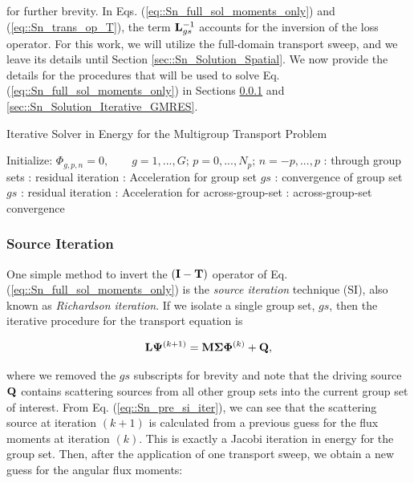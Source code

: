\noindent for further brevity. In Eqs. (\ref{eq::Sn_full_sol_moments_only}) and (\ref{eq::Sn_trans_op_T}), the term ${\bf L}_{gs}^{-1}$ accounts for the inversion of the loss operator. For this work, we will utilize the full-domain transport sweep, and we leave its details until Section \ref{sec::Sn_Solution_Spatial}. We now provide the details for the procedures that will be used to solve Eq. (\ref{eq::Sn_full_sol_moments_only}) in Sections \ref{sec::Sn_Solution_Iterative_SI} and \ref{sec::Sn_Solution_Iterative_GMRES}.

\begin{algorithm}
\caption{Iterative Solver in Energy for the Multigroup Transport Problem}
\label{alg::Sn_Linear_Transport_Solve}
\begin{algorithmic}[1]
\State Initialize: $\Phi_{g,p,n} = 0, \qquad g=1,...,G; \, p=0,...,N_p; \, n=-p,...,p$
	: through group sets
			: residual iteration
			: Acceleration for group set $gs$
			: convergence of group set $gs$
		\EndFor
	\EndFor
	: residual iteration
	:  Acceleration for across-group-set
	: across-group-set convergence
\EndFor
\end{algorithmic}
\end{algorithm}

\subsubsection{Source Iteration}
\label{sec::Sn_Solution_Iterative_SI}

One simple method to invert the $({\bf I} - {\bf T})$ operator of Eq. (\ref{eq::Sn_full_sol_moments_only}) is the {\em source iteration} technique (SI), also known as {\em Richardson iteration}. If we isolate a single group set, $gs$, then the iterative procedure for the transport equation is

\begin{equation}
\label{eq::Sn_pre_si_iter}
{\bf L} {\bf \Psi}^{(k+1)} =    {\bf M} {\bf \Sigma} {\bf \Phi}^{(k)} +  {\bf Q} ,
\end{equation}

\noindent where we removed the $gs$ subscripts for brevity and note that the driving source ${\bf Q}$ contains scattering sources from all other group sets into the current group set of interest. From Eq. (\ref{eq::Sn_pre_si_iter}), we can see that the scattering source at iteration $(k+1)$ is calculated from a previous guess for the flux moments at iteration $(k)$. This is exactly a Jacobi iteration in energy for the group set. Then, after the application of one transport sweep, we obtain a new guess for the angular flux moments:

